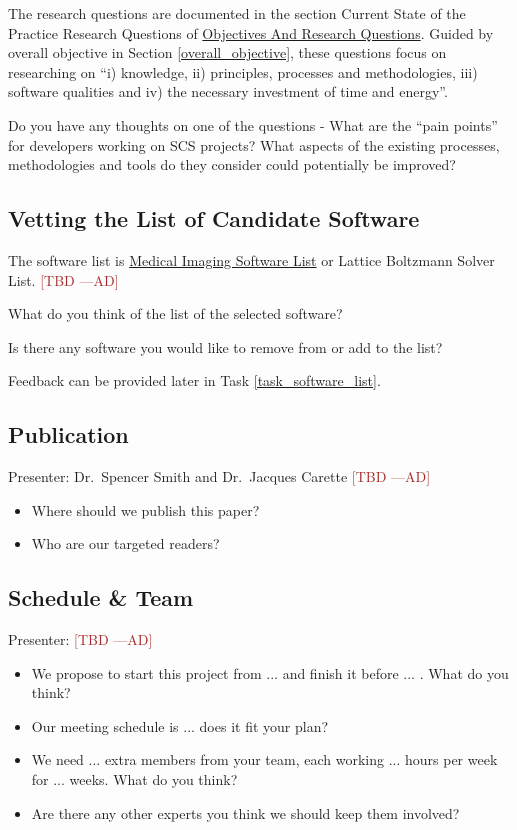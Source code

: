 \documentclass[12pt]{article}
\newcommand{\authornote}[3]{\textcolor{#1}{[#3 ---#2]}}
\newcommand{\authornote}[3]{}
\newcommand{\ad}[1]{\authornote{brown}{AD}{#1}} %
\begin{document}
The research questions are documented in the section Current State of the
Practice Research Questions of
\href{https://github.com/smiths/AIMSS/blob/master/OverallResearchProposal/ObjectivesAndResearchQuestions.pdf}{Objectives
And Research Questions}. Guided by overall objective in Section
\ref{overall_objective}, these questions focus on researching on ``i) knowledge,
ii) principles, processes
and methodologies, iii) software qualities and iv) the necessary investment of
time and energy''.

Do you have any thoughts on one of the questions - What are the ``pain points''
for developers working on SCS projects? What aspects of the existing processes,
methodologies and tools do they consider could potentially be improved?

\subsection{Vetting the List of Candidate Software}
\label{software_list}

The software list is
\href{https://docs.google.com/spreadsheets/d/122wU0v3ZtvDcqy8C4zKJ89kU-8fXAbo3Mzn6vcVXOi0/edit?usp=sharing}{Medical
	Imaging Software List} or Lattice Boltzmann Solver List. \ad{TBD}

What do you think of the list of the selected software?

Is there any software you would like to remove from or add to the list?

Feedback can be provided later in Task \ref{task_software_list}.

\subsection{Publication}
Presenter: Dr.\ Spencer Smith and Dr.\ Jacques Carette \ad{TBD}

\begin{itemize}
\item Where should we publish this paper?
\item Who are our targeted readers?
\end{itemize}

\subsection{Schedule \& Team}
Presenter: \ad{TBD}

\begin{itemize}
\item We propose to start this project from ... and finish it before ... . What
do you think?
\item Our meeting schedule is ... does it fit your plan?
\item We need ... extra members from your team, each working ... hours per week
for ... weeks. What do you think?
\item Are there any other experts you think we should keep them involved?
\end{itemize}
\end{document}
